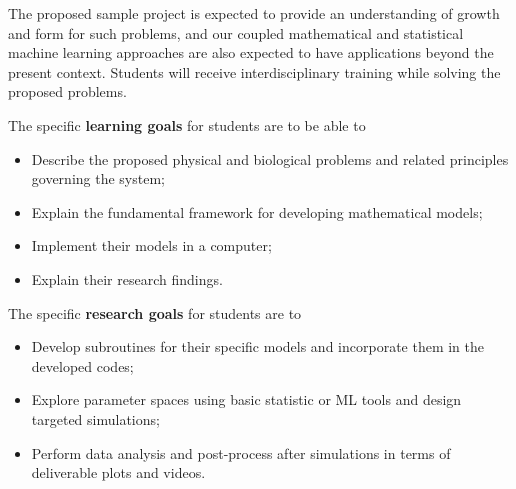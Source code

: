 The proposed sample project is expected to provide an understanding of growth and form for such problems, and our coupled mathematical and statistical machine learning approaches are also expected to have applications beyond the present context.  Students will receive interdisciplinary training while solving the proposed problems. %

The specific {\bf learning goals} for students are to be able to 
\begin{itemize}[leftmargin=.5cm]\vspace{-1ex}
    \item  Describe the proposed physical and biological problems and related principles governing the system; 
    \item  Explain the fundamental framework for developing mathematical models;
    \item  Implement their models in a computer; 
    \item  Explain their research findings.
\end{itemize}
The specific {\bf research goals} for students are to 
\begin{itemize}[leftmargin=.5cm]\vspace{-1ex}
    \item  Develop subroutines for their specific models and incorporate them in the developed codes;
    \item  Explore parameter spaces using basic statistic or ML tools and design  targeted simulations;
    \item  Perform data analysis and post-process after simulations in terms of deliverable plots and videos.
\end{itemize}

